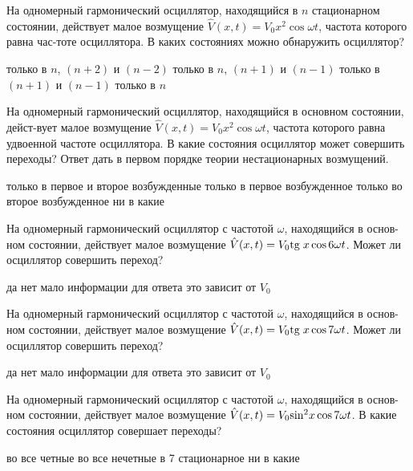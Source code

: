 \documentclass[11pt,a4paper]{exam}
\begin{document}
\begin{questions}
\question На одномерный гармонический осциллятор, находящийся в $n$ стационарном состоянии, действует малое возмущение $\hat V(x,t) = {V_0}{x^2}\cos \omega t$, частота которого равна час-тоте осциллятора. В каких состояниях можно обнаружить осциллятор? 
\begin{choices}
\choice только в $n$, $(n + 2)$ и $(n - 2)$       
\choice только в $n$, $(n + 1)$ и $(n - 1)$
\choice только в $(n + 1)$ и $(n - 1)$         
\choice только в $n$
\end{choices}

\question На одномерный гармонический осциллятор, находящийся в основном состоянии, дейст-вует малое возмущение $\hat V(x,t) = {V_0}{x^2}\cos \omega t$, частота которого равна удвоенной частоте осциллятора. В какие состояния осциллятор может совершить переходы? Ответ дать в первом порядке теории нестационарных возмущений.
\begin{choices}
\choice только в первое и второе возбужденные
\choice только в первое возбужденное 
\choice только во второе возбужденное
\choice ни в какие
\end{choices}

\question На одномерный гармонический осциллятор с частотой $\omega $, находящийся в основ-ном состоянии, действует малое возмущение $\hat V(x,t) = {V_0}{\rm{tg}}\;x\cos 6\omega t$. Может ли осциллятор совершить переход?
\begin{choices}
\choice да    
\choice нет      
\choice мало информации для ответа    
\choice это зависит от ${V_0}$
\end{choices}

\question На одномерный гармонический осциллятор с частотой $\omega $, находящийся в основ-ном состоянии, действует малое возмущение $\hat V(x,t) = {V_0}{\rm{tg}}\;x\cos 7\omega t$. Может ли осциллятор совершить переход?
\begin{choices}
\choice да    
\choice нет      
\choice мало информации для ответа    
\choice это зависит от ${V_0}$
\end{choices}

\question На одномерный гармонический осциллятор с частотой $\omega $, находящийся в основ-ном состоянии, действует малое возмущение $\hat V(x,t) = {V_0}{\rm{si}}{{\rm{n}}^{\rm{2}}}x\cos 7\omega t$. В какие состояния осциллятор совершает переходы?
\begin{choices}
\choice во все четные  
\choice во все нечетные   
\choice в 7 стационарное  
\choice ни в какие
\end{choices}


\end{questions}
\end{document}
